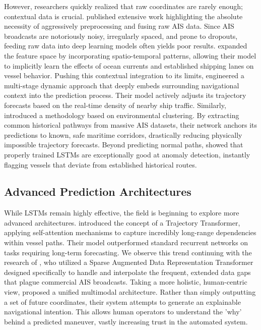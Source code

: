 However, researchers quickly realized that raw coordinates are rarely enough; contextual data is crucial. \cite{Chondrodima2023} published extensive work highlighting the absolute necessity of aggressively preprocessing and fusing raw AIS data. Since AIS broadcasts are notoriously noisy, irregularly spaced, and prone to dropouts, feeding raw data into deep learning models often yields poor results. \cite{Zhao2024} expanded the feature space by incorporating spatio-temporal patterns, allowing their model to implicitly learn the effects of ocean currents and established shipping lanes on vessel behavior. Pushing this contextual integration to its limits, \cite{Zhang2024} engineered a multi-stage dynamic approach that deeply embeds surrounding navigational context into the prediction process. Their model actively adjusts its trajectory forecasts based on the real-time density of nearby ship traffic. Similarly, \cite{Zygouras2024} introduced a methodology based on environmental clustering. By extracting common historical pathways from massive AIS datasets, their network anchors its predictions to known, safe maritime corridors, drastically reducing physically impossible trajectory forecasts. Beyond predicting normal paths, \cite{Liu2022} showed that properly trained LSTMs are exceptionally good at anomaly detection, instantly flagging vessels that deviate from established historical routes.

\subsection{Advanced Prediction Architectures}
While LSTMs remain highly effective, the field is beginning to explore more advanced architectures. \cite{Wang2024a} introduced the concept of a Trajectory Transformer, applying self-attention mechanisms to capture incredibly long-range dependencies within vessel paths. Their model outperformed standard recurrent networks on tasks requiring long-term forecasting. We observe this trend continuing with the research of \cite{Nguyen2024}, who utilized a Sparse Augmented Data Representation Transformer designed specifically to handle and interpolate the frequent, extended data gaps that plague commercial AIS broadcasts. Taking a more holistic, human-centric view, \cite{Zhang2026a} proposed a unified multimodal architecture. Rather than simply outputting a set of future coordinates, their system attempts to generate an explainable navigational intention. This allows human operators to understand the 'why' behind a predicted maneuver, vastly increasing trust in the automated system.

